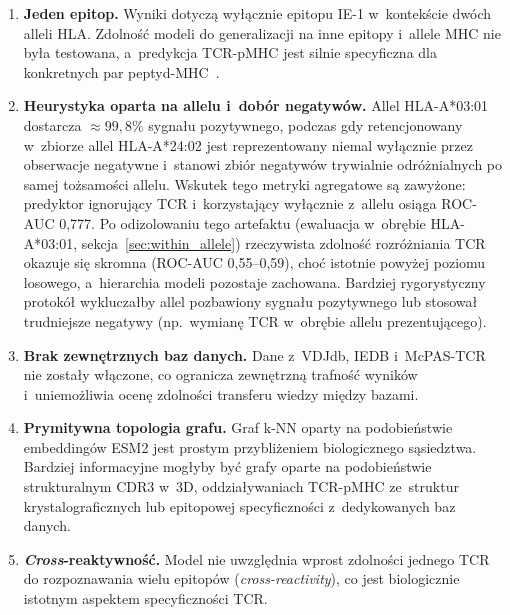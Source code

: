 \documentclass{SGGW-thesis}
\begin{document}
\begin{enumerate}
  \item \textbf{Jeden epitop.} Wyniki dotyczą wyłącznie epitopu IE-1 w~kontekście dwóch alleli
        HLA. Zdolność modeli do generalizacji na inne epitopy i~allele MHC nie była testowana,
        a~predykcja TCR-pMHC jest silnie specyficzna dla konkretnych par peptyd-MHC~\cite{moris2021}.

  \item \textbf{Heurystyka oparta na allelu i~dobór negatywów.} Allel HLA-A*03:01
        dostarcza ${\approx}99{,}8\%$ sygnału pozytywnego, podczas gdy retencjonowany
        w~zbiorze allel HLA-A*24:02 jest reprezentowany niemal wyłącznie przez obserwacje
        negatywne i~stanowi zbiór negatywów trywialnie odróżnialnych po samej tożsamości allelu. Wskutek tego metryki
        agregatowe są zawyżone: predyktor ignorujący TCR i~korzystający wyłącznie
        z~allelu osiąga ROC-AUC 0{,}777. Po odizolowaniu tego artefaktu (ewaluacja
        w~obrębie HLA-A*03:01, sekcja~\ref{sec:within_allele}) rzeczywista zdolność
        rozróżniania TCR okazuje się skromna (ROC-AUC 0{,}55--0{,}59), choć istotnie
        powyżej poziomu losowego, a~hierarchia modeli pozostaje zachowana. Bardziej
        rygorystyczny protokół wykluczałby allel pozbawiony sygnału pozytywnego lub
        stosował trudniejsze negatywy (np.\ wymianę TCR w~obrębie allelu prezentującego).

  \item \textbf{Brak zewnętrznych baz danych.} Dane z~VDJdb, IEDB i~McPAS-TCR nie zostały
        włączone, co ogranicza zewnętrzną trafność wyników i~uniemożliwia ocenę zdolności
        transferu wiedzy między bazami.

  \item \textbf{Prymitywna topologia grafu.} Graf k-NN oparty na podobieństwie embeddingów
        ESM2 jest prostym przybliżeniem biologicznego sąsiedztwa. Bardziej informacyjne mogłyby
        być grafy oparte na podobieństwie strukturalnym CDR3 w~3D, oddziaływaniach
        TCR-pMHC ze~struktur krystalograficznych lub epitopowej specyficzności z~dedykowanych
        baz danych.

  \item \textbf{\textit{Cross}-reaktywność.} Model nie uwzględnia wprost zdolności jednego TCR do
        rozpoznawania wielu epitopów (\textit{cross-reactivity}), co jest biologicznie istotnym
        aspektem specyficzności TCR.


\end{enumerate}
\end{document}
